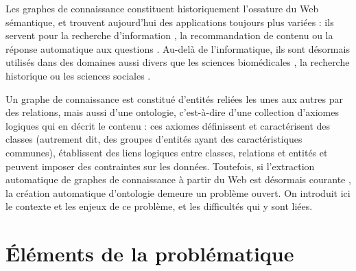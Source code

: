 \label{sec:Introduction}  %

Les graphes de connaissance constituent historiquement l'ossature du Web sémantique, et trouvent aujourd'hui des applications toujours plus variées : ils servent pour la recherche d'information \cite{bounhas2019building, dietz2018utilizing}, la recommandation de contenu \cite{ying2018graph, wang2018ripplenet, wang2019explainable} ou la réponse automatique aux questions \cite{zhang2018variational, lukovnikov2017neural, saha2018complex}.  %
Au-delà de l'informatique, ils sont désormais utilisés dans des domaines aussi divers que les sciences biomédicales \cite{bakal2018exploiting, sousa2020evolving}, la recherche historique \cite{hyvonen2019knowledge, wilcke2017user} ou les sciences sociales \cite{heling2019building}.

%
Un graphe de connaissance est constitué d'entités reliées les unes aux autres par des relations, mais aussi d'une ontologie, c'est-à-dire d'une collection d'axiomes logiques qui en décrit le contenu : ces axiomes définissent et caractérisent des classes (autrement dit, des groupes d'entités ayant des caractéristiques communes),  établissent des liens logiques entre classes, relations et entités et peuvent imposer des contraintes sur les données. Toutefois, si l'extraction automatique de graphes de connaissance à partir du Web est désormais courante \cite{auer2007dbpedia}, la création automatique d'ontologie demeure un problème ouvert. On introduit ici le contexte et les enjeux de ce problème, et les difficultés qui y sont liées.


\section{Éléments de la problématique}  %



